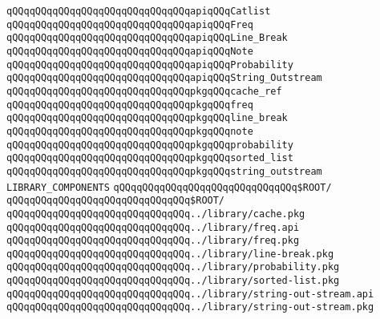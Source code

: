 \verb|qQQqqQQqqQQqqQQqqQQqqQQqqQQqqQQqapiqQQqCatlist|\newline
\verb|qQQqqQQqqQQqqQQqqQQqqQQqqQQqqQQqapiqQQqFreq|\newline
\verb|qQQqqQQqqQQqqQQqqQQqqQQqqQQqqQQqapiqQQqLine_Break|\newline
\verb|qQQqqQQqqQQqqQQqqQQqqQQqqQQqqQQqapiqQQqNote|\newline
\verb|qQQqqQQqqQQqqQQqqQQqqQQqqQQqqQQqapiqQQqProbability|\newline
\verb|qQQqqQQqqQQqqQQqqQQqqQQqqQQqqQQqapiqQQqString_Outstream|\newline
\newline
\verb|qQQqqQQqqQQqqQQqqQQqqQQqqQQqqQQqpkgqQQqcache_ref|\newline
\verb|qQQqqQQqqQQqqQQqqQQqqQQqqQQqqQQqpkgqQQqfreq|\newline
\verb|qQQqqQQqqQQqqQQqqQQqqQQqqQQqqQQqpkgqQQqline_break|\newline
\verb|qQQqqQQqqQQqqQQqqQQqqQQqqQQqqQQqpkgqQQqnote|\newline
\verb|qQQqqQQqqQQqqQQqqQQqqQQqqQQqqQQqpkgqQQqprobability|\newline
\verb|qQQqqQQqqQQqqQQqqQQqqQQqqQQqqQQqpkgqQQqsorted_list|\newline
\verb|qQQqqQQqqQQqqQQqqQQqqQQqqQQqqQQqpkgqQQqstring_outstream|\newline
\newline
\newline
\newline
\verb|LIBRARY_COMPONENTS|\newline
\newline
\verb|qQQqqQQqqQQqqQQqqQQqqQQqqQQqqQQq$ROOT/|\newline
\newline
\verb|qQQqqQQqqQQqqQQqqQQqqQQqqQQqqQQq$ROOT/|\newline
\newline
\verb|qQQqqQQqqQQqqQQqqQQqqQQqqQQqqQQq../library/cache.pkg|\newline
\verb|qQQqqQQqqQQqqQQqqQQqqQQqqQQqqQQq../library/freq.api|\newline
\verb|qQQqqQQqqQQqqQQqqQQqqQQqqQQqqQQq../library/freq.pkg|\newline
\verb|qQQqqQQqqQQqqQQqqQQqqQQqqQQqqQQq../library/line-break.pkg|\newline
\verb|qQQqqQQqqQQqqQQqqQQqqQQqqQQqqQQq../library/probability.pkg|\newline
\verb|qQQqqQQqqQQqqQQqqQQqqQQqqQQqqQQq../library/sorted-list.pkg|\newline
\verb|qQQqqQQqqQQqqQQqqQQqqQQqqQQqqQQq../library/string-out-stream.api|\newline
\verb|qQQqqQQqqQQqqQQqqQQqqQQqqQQqqQQq../library/string-out-stream.pkg|\newline

